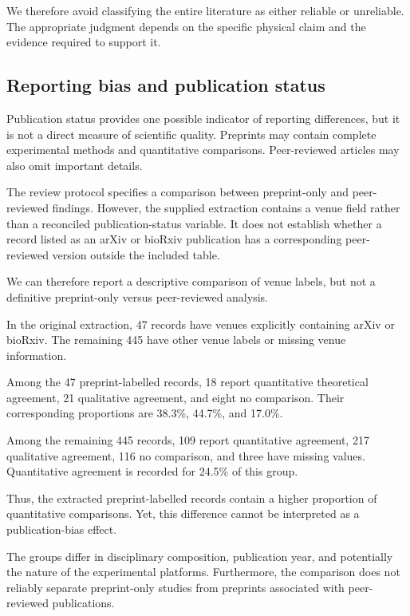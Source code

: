 We therefore avoid classifying
the entire literature as
either reliable or unreliable.
The appropriate judgment
depends on the specific
physical claim and the
evidence required to
support it.

\subsection{Reporting bias and publication status}
\label{sec:discussion-reporting}

Publication status provides one possible indicator
of reporting differences, but it is not a
direct measure of scientific quality.
Preprints may contain complete experimental
methods and quantitative comparisons.
Peer-reviewed articles may also omit
important details.

The review protocol specifies a comparison
between preprint-only and peer-reviewed
findings. However, the supplied extraction
contains a venue field rather than a
reconciled publication-status variable.
It does not establish whether a record
listed as an arXiv or bioRxiv publication
has a corresponding peer-reviewed version
outside the included table.

We can therefore report a descriptive
comparison of venue labels, but not
a definitive preprint-only versus
peer-reviewed analysis.

In the original extraction,
47 records have venues explicitly
containing arXiv or bioRxiv.
The remaining 445 have other
venue labels or missing
venue information.

Among the 47 preprint-labelled records,
18 report quantitative theoretical
agreement, 21 qualitative agreement,
and eight no comparison.
Their corresponding proportions
are 38.3\%, 44.7\%,
and 17.0\%.

Among the remaining 445 records,
109 report quantitative agreement,
217 qualitative agreement,
116 no comparison,
and three have missing values.
Quantitative agreement is
recorded for 24.5\%
of this group.

Thus, the extracted preprint-labelled
records contain a higher proportion
of quantitative comparisons.
Yet, this difference cannot
be interpreted as a
publication-bias effect.

The groups differ in disciplinary
composition, publication year,
and potentially the nature
of the experimental platforms.
Furthermore, the comparison
does not reliably separate
preprint-only studies from
preprints associated with
peer-reviewed publications.

